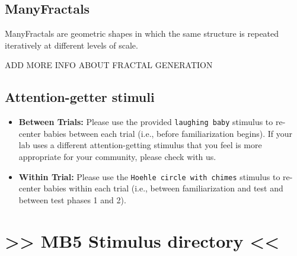 \documentclass[
  letterpaper,
  DIV=11,
  numbers=noendperiod,
  oneside]{scrreprt}
\providecommand{\tightlist}{%
  \setlength{\itemsep}{0pt}\setlength{\parskip}{0pt}}
\begin{document}
\section{ManyFractals}\label{manyfractals}

ManyFractals are geometric shapes in which the same structure is
repeated iteratively at different levels of scale.

\begin{tcolorbox}[enhanced jigsaw, coltitle=black, colframe=quarto-callout-caution-color-frame, titlerule=0mm, colback=white, arc=.35mm, toprule=.15mm, left=2mm, colbacktitle=quarto-callout-caution-color!10!white, opacityback=0, bottomtitle=1mm, title=\textcolor{quarto-callout-caution-color}{\faFire}\hspace{0.5em}{In development}, breakable, rightrule=.15mm, opacitybacktitle=0.6, toptitle=1mm, leftrule=.75mm, bottomrule=.15mm]

ADD MORE INFO ABOUT FRACTAL GENERATION

\end{tcolorbox}

\section{Attention-getter stimuli}\label{attention-getter-stimuli}

\begin{itemize}
\tightlist
\item
  \textbf{Between Trials:} Please use the provided
  \texttt{laughing\ baby} stimulus to re-center babies between each
  trial (i.e., before familiarization begins). If your lab uses a
  different attention-getting stimulus that you feel is more appropriate
  for your community, please check with us.
\item
  \textbf{Within Trial:} Please use the
  \texttt{Hoehle\ circle\ with\ chimes} stimulus to re-center babies
  within each trial (i.e., between familiarization and test and between
  test phases 1 and 2).
\end{itemize}

\chapter*{\texorpdfstring{\textgreater\textgreater{} \textbf{MB5}
Stimulus directory
\textless\textless{}}{\textgreater\textgreater{} MB5 Stimulus directory \textless\textless{}}}\label{stimulus-directory}
\end{document}
